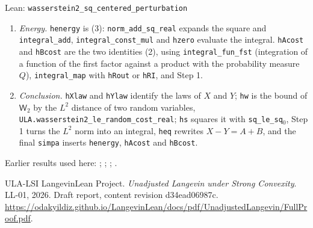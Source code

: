 \documentclass[11pt,a4paper]{article}
\begin{document}
\begin{leanbox}{Lean: \texttt{wasserstein2\_\allowbreak{}sq\_\allowbreak{}centered\_\allowbreak{}perturbation}}
\begin{enumerate}
\item \emph{Energy.} \texttt{henergy} is (3): \texttt{norm\_\allowbreak{}add\_\allowbreak{}sq\_\allowbreak{}real} expands the square and \texttt{integral\_\allowbreak{}add}, \texttt{integral\_\allowbreak{}const\_\allowbreak{}mul} and \texttt{hzero} evaluate the integral. \texttt{h\allowbreak{}Acost} and \texttt{h\allowbreak{}Bcost} are the two identities (2), using \texttt{integral\_\allowbreak{}fun\_\allowbreak{}fst} (integration of a function of the first factor against a product with the probability measure \(Q\)), \texttt{integral\_\allowbreak{}map} with \texttt{h\allowbreak{}Rout} or \texttt{h\allowbreak{}RI}, and Step 1.

\item \emph{Conclusion.} \texttt{h\allowbreak{}Xlaw} and \texttt{h\allowbreak{}Ylaw} identify the laws of \(X\) and \(Y\); \texttt{hw} is the bound of \(\mathsf W_2\) by the \(L^2\) distance of two random variables, \texttt{ULA.\allowbreak{}wasserstein2\_\allowbreak{}le\_\allowbreak{}random\_\allowbreak{}cost\_\allowbreak{}real}; \texttt{hs} squares it with \texttt{sq\_\allowbreak{}le\_\allowbreak{}sq\ensuremath{{}_{0}}}, Step 1 turns the \(L^2\) norm into an integral, \texttt{heq} rewrites \(X-Y=A+B\), and the final \texttt{simpa} inserts \texttt{henergy}, \texttt{h\allowbreak{}Acost} and \texttt{h\allowbreak{}Bcost}.

\end{enumerate}
\end{leanbox}


Earlier results used here: \cite[Section~3.17.11]{LangevinLean2026ULASC}; \cite[Section~3.17.2]{LangevinLean2026ULASC}; \cite[Section~3.17.4]{LangevinLean2026ULASC}; \cite[Section~3.21.2]{LangevinLean2026ULASC}.

\begin{thebibliography}{ULA-LSI}
LangevinLean Project. \emph{Unadjusted Langevin under Strong Convexity}. LL-01, 2026. Draft report, content revision d34ead06987c. \url{https://odakyildiz.github.io/LangevinLean/docs/pdf/UnadjustedLangevin/FullProof.pdf}.
\end{thebibliography}
\end{document}
